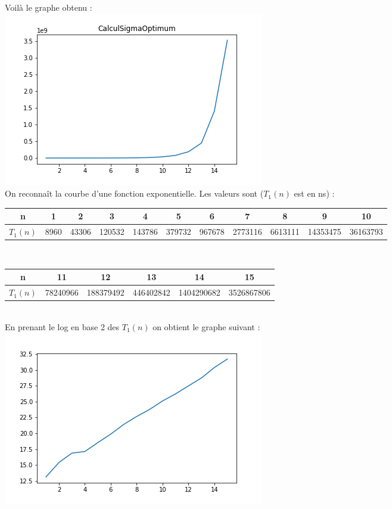 \documentclass{article}
\begin{document}
Voilà le graphe obtenu : \\
\includegraphics[scale=0.5]{CalculSigmaOptimum.png}
\\
On reconnaît la courbe d'une fonction exponentielle. Les valeurs sont ($T_1(n)$ est en ns) : \\
\begin{tabular}{|c|c|c|c|c|c|c|c|c|c|c|}
  \hline
  n & 1 & 2 & 3 & 4 & 5 & 6 & 7 & 8 & 9 & 10 \\
  \hline
  $T_1(n)$ & 8960 & 43306 & 120532 & 143786 & 379732 & 967678 & 2773116 & 6613111 & 14353475 & 36163793 \\
  \hline
\end{tabular}
\\
\begin{tabular}{|c|c|c|c|c|c|}
\hline
n &11 & 12 & 13 & 14 & 15 \\
\hline
$T_1(n)$ & 78240966 & 188379492 & 446402842 & 1404290682 & 3526867806 \\
\hline
\end{tabular} \\
En prenant le log en base 2 des $T_1(n)$ on obtient le graphe suivant : \\
\includegraphics[scale=0.5]{Sigma1log.png} \\
\end{document}
